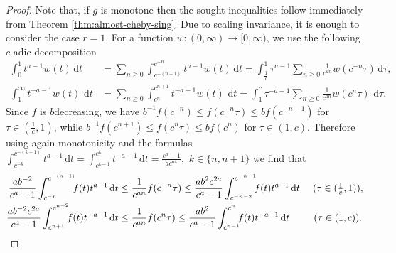 \documentclass[12pt, reqno]{amsart}%
\theoremstyle{plain}  %
\theoremstyle{definition}  %
\theoremstyle{remark}
\numberwithin{equation}{section}
\renewcommand{\d}{\,\mathrm{d}}
\begin{document}
\begin{proof}
Note that, if $g$ is monotone then the sought inequalities follow immediately  from Theorem \ref{thm:almost-cheby-sing}.  Due to scaling invariance, it is enough to consider the case  $r=1$. For a function $w:(0,\infty)\to[0,\infty)$, we use the following $c$-adic decomposition
\begin{align*}
\int_0^1 t^{a -1}w(t) \d t
&= \sum_{n \geq 0} \int_{c^{-(n+1)}}^{c^{-n}} t^{a -1} w(t) \d t
= \int_{\tfrac{1}{c}}^{1} \tau^{a -1} \sum_{n \geq 0} \frac{1}{c^{a n}}
w(c^{-n} \tau) \d \tau,\\
\int_1^\infty t^{-a -1} w(t)\, \d t
&= \sum_{n \geq 0} \int_{c^n}^{c^{n+1}} t^{-a -1} w(t)\, \d t
= \int_{1}^{c} \tau^{-a -1} \sum_{n \geq 0} \frac{1}{c^{a n}} w(c^n \tau)\, \d \tau.
\end{align*}
Since $f$ is $b$decreasing,  we have
$b^{-1}f(c^{-n})\leq f(c^{-n} \tau)\leq bf(c^{-n-1})$ for $\tau \in (\tfrac{1}{c},1)$,
while $b^{-1}f(c^{n+1})\leq f(c^{n} \tau)\leq bf(c^{n})$ for $\tau \in (1,c)$.
Therefore using again monotonicity and the formulas  $\int_{c^{-k}}^{c^{-(k-1)}} t^{a -1}  \d t
= \int_{c^{k-1}}^{c^{k}} t^{-a -1}  \d t
= \frac{c^{a}-1}{a c^{a k}},$ $k\in \{n,n+1\} $
we find that
\begin{align*}
\frac{ab^{-2}}{c^a-1}\int_{c^{-n}}^{c^{-(n-1)}}\hspace*{-1ex} f(t)t^{a -1} \d t &
\leq
\frac{1}{c^{a n}} f(c^{-n} \tau)\leq  	\frac{a b^2 c^{2a}}{c^a-1}\int_{c^{-n-2}}^{c^{-n-1}} \hspace*{-1ex} f(t)t^{a -1} \d t
\quad \,\, (\tau \in (\tfrac{1}{c},1)),\\
\frac{a b^{-2}c^{2a}}{c^a-1}\int_{c^{n+1}}^{c^{n+2}} \hspace*{-1ex} f(t)t^{-a -1}  \d t& \leq
\frac{1}{c^{a n}} f(c^{n} \tau)
\leq \frac{a b^2}{c^a-1} \int_{c^{n-1}}^{c^{n}} \hspace*{-1ex}f(t)t^{-a -1}  \d t \,\,\,\qquad (\tau \in (1,c)).
\end{align*}


\end{proof}
\end{document}
